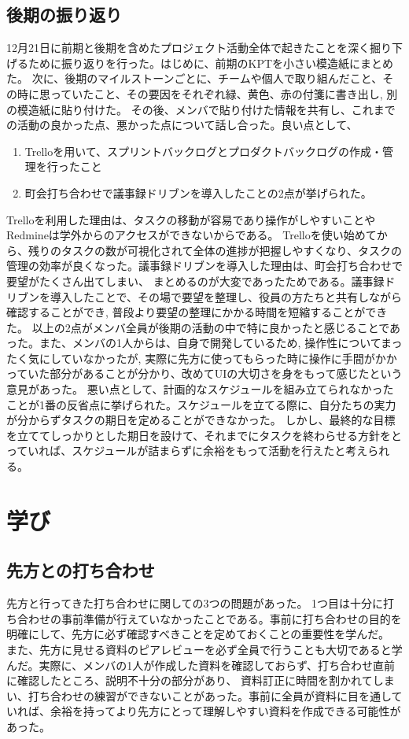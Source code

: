 \section{後期の振り返り}
12月21日に前期と後期を含めたプロジェクト活動全体で起きたことを深く掘り下げるために振り返りを行った。はじめに、前期のKPTを小さい模造紙にまとめた。
次に、後期のマイルストーンごとに、チームや個人で取り組んだこと、その時に思っていたこと、その要因をそれぞれ緑、黄色、赤の付箋に書き出し, 別の模造紙に貼り付けた。
その後、メンバで貼り付けた情報を共有し、これまでの活動の良かった点、悪かった点について話し合った。良い点として、
\begin{enumerate}
    \item Trelloを用いて、スプリントバックログとプロダクトバックログの作成・管理を行ったこと
    \item 町会打ち合わせで議事録ドリブンを導入したことの2点が挙げられた。
\end{enumerate}
Trelloを利用した理由は、タスクの移動が容易であり操作がしやすいことやRedmineは学外からのアクセスができないからである。
Trelloを使い始めてから、残りのタスクの数が可視化されて全体の進捗が把握しやすくなり、タスクの管理の効率が良くなった。議事録ドリブンを導入した理由は、町会打ち合わせで要望がたくさん出てしまい、
まとめるのが大変であったためである。議事録ドリブンを導入したことで、その場で要望を整理し、役員の方たちと共有しながら確認することができ, 普段より要望の整理にかかる時間を短縮することができた。
以上の2点がメンバ全員が後期の活動の中で特に良かったと感じることであった。また、メンバの1人からは、自身で開発しているため, 操作性についてまったく気にしていなかったが,
実際に先方に使ってもらった時に操作に手間がかかっていた部分があることが分かり、改めてUIの大切さを身をもって感じたという意見があった。
悪い点として、計画的なスケジュールを組み立てられなかったことが1番の反省点に挙げられた。スケジュールを立てる際に、自分たちの実力が分からずタスクの期日を定めることができなかった。
しかし、最終的な目標を立ててしっかりとした期日を設けて、それまでにタスクを終わらせる方針をとっていれば、スケジュールが詰まらずに余裕をもって活動を行えたと考えられる。

\chapter{学び}
\section{先方との打ち合わせ}
先方と行ってきた打ち合わせに関しての3つの問題があった。
1つ目は十分に打ち合わせの事前準備が行えていなかったことである。事前に打ち合わせの目的を明確にして、先方に必ず確認すべきことを定めておくことの重要性を学んだ。
また、先方に見せる資料のピアレビューを必ず全員で行うことも大切であると学んだ。実際に、メンバの1人が作成した資料を確認しておらず、打ち合わせ直前に確認したところ、説明不十分の部分があり、
資料訂正に時間を割かれてしまい、打ち合わせの練習ができないことがあった。事前に全員が資料に目を通していれば、余裕を持ってより先方にとって理解しやすい資料を作成できる可能性があった。

